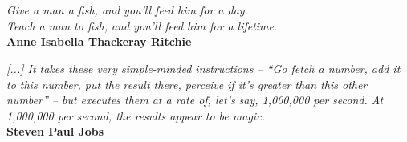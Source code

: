 \section*{}

\begin{flushright}

\vspace*{\fill}

\textit{Give a man a fish, and you'll feed him for a day.\\
Teach a man to fish, and you'll feed him for a lifetime}.\\
\textbf{Anne Isabella Thackeray Ritchie}

\vspace{2.5cm}

\textit{[...] It takes these very simple-minded instructions -- ``Go fetch a number, add it to this number, put the result there, perceive if it's greater than this other number'' -- but executes them at a rate of, let's say, 1,000,000 per second. At 1,000,000 per second, the results appear to be magic.}\\
\textbf{Steven Paul Jobs}
\end{flushright}

\vspace*{\fill}